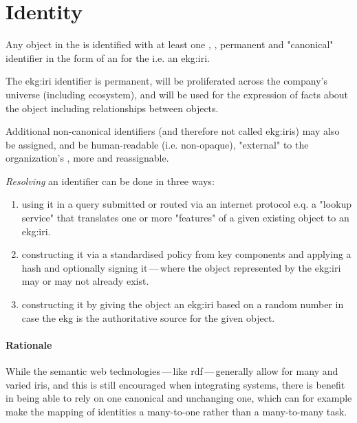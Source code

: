 \section{Identity}\label{sec:ekg-principles-identity}

Any object in the  is identified with at least one , ,
permanent and  "canonical" identifier in the form of an  for
the  i.e. an \gls{ekg:iri}.

The \gls{ekg:iri} identifier is permanent, will be proliferated across the company's universe (including ecosystem),
and will be used for the expression of facts about the object including relationships between objects.

Additional non-canonical identifiers (and therefore not called \glspl{ekg:iri}) may also be assigned,
and   be human-readable (i.e. non-opaque), "external" to
the organization's , more  and reassignable.

\textit{Resolving} an identifier can be done in three ways:
\begin{enumerate}
    \item using it in a query submitted or routed via an internet protocol e.q. a "lookup service" that translates
          one or more "features" of a given existing object to an \gls{ekg:iri}.
    \item constructing it via a standardised policy from key components and applying a hash and optionally
          signing it\,---\,where the object represented by the \gls{ekg:iri} may or may not already exist.
    \item constructing it by giving the object an \gls{ekg:iri} based on a random number in case the \gls{ekg} is
          the authoritative source for the given object.
\end{enumerate}

\paragraph{Rationale}

While the semantic web technologies\,---\,like \gls{rdf}\,---\,generally allow for many and varied \glspl{iri},
and this is still encouraged when integrating systems, there is benefit in being able to rely on one canonical
and unchanging one, which can for example make the mapping of identities a many-to-one rather than a many-to-many task.


